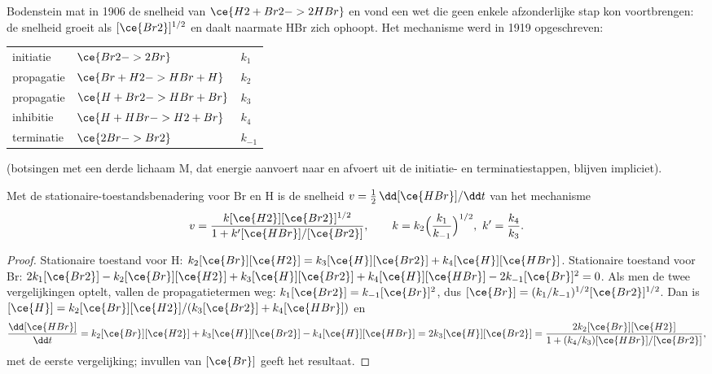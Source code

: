 Bodenstein mat in 1906 de snelheid van $\ce{H2 + Br2 -> 2 HBr}$ en vond een
wet die geen enkele afzonderlijke stap kon voortbrengen: de snelheid
groeit als $[\ce{Br2}]^{1/2}$ en daalt naarmate HBr zich ophoopt. Het
mechanisme werd in 1919 opgeschreven:
\begin{center}
\begin{tabular}{lll}
initiatie & $\ce{Br2 -> 2 Br}$ & $k_1$ \\
propagatie & $\ce{Br + H2 -> HBr + H}$ & $k_2$ \\
propagatie & $\ce{H + Br2 -> HBr + Br}$ & $k_3$ \\
inhibitie & $\ce{H + HBr -> H2 + Br}$ & $k_4$ \\
terminatie & $\ce{2 Br -> Br2}$ & $k_{-1}$
\end{tabular}
\end{center}
(botsingen met een derde lichaam M, dat energie aanvoert naar en afvoert
uit de initiatie- en terminatiestappen, blijven impliciet).

\begin{theorem}\label{thm:b3:complex-kinetics:hbr}
Met de stationaire-toestandsbenadering voor Br en H is de snelheid $v = \frac12\,\dd[\ce{HBr}]/\dd t$
van het mechanisme
\[
  v = \frac{k[\ce{H2}][\ce{Br2}]^{1/2}}{1 + k'[\ce{HBr}]/[\ce{Br2}]},
  \qquad k = k_2\Bigl(\frac{k_1}{k_{-1}}\Bigr)^{1/2},\ k' = \frac{k_4}{k_3}.
\]
\end{theorem}

\begin{proof}
Stationaire toestand voor H: $k_2[\ce{Br}][\ce{H2}] = k_3[\ce{H}][\ce{Br2}] + k_4[\ce{H}][\ce{HBr}]$. Stationaire toestand voor Br:
$2k_1[\ce{Br2}] - k_2[\ce{Br}][\ce{H2}] + k_3[\ce{H}][\ce{Br2}] + k_4[\ce{H}][\ce{HBr}] - 2k_{-1}[\ce{Br}]^2 = 0$. Als men de twee
vergelijkingen optelt, vallen de propagatietermen weg: $k_1[\ce{Br2}] = k_{-1}[\ce{Br}]^2$, dus $[\ce{Br}] =
(k_1/k_{-1})^{1/2}[\ce{Br2}]^{1/2}$. Dan is $[\ce{H}] = k_2[\ce{Br}][\ce{H2}]/(k_3[\ce{Br2}] + k_4[\ce{HBr}])$ en
\[
  \frac{\dd[\ce{HBr}]}{\dd t} = k_2[\ce{Br}][\ce{H2}] + k_3[\ce{H}][\ce{Br2}] - k_4[\ce{H}][\ce{HBr}] = 2k_3[\ce{H}][\ce{Br2}]
  = \frac{2k_2[\ce{Br}][\ce{H2}]}{1 + (k_4/k_3)[\ce{HBr}]/[\ce{Br2}]},
\]
met de eerste vergelijking; invullen van $[\ce{Br}]$ geeft het resultaat.
\end{proof}

